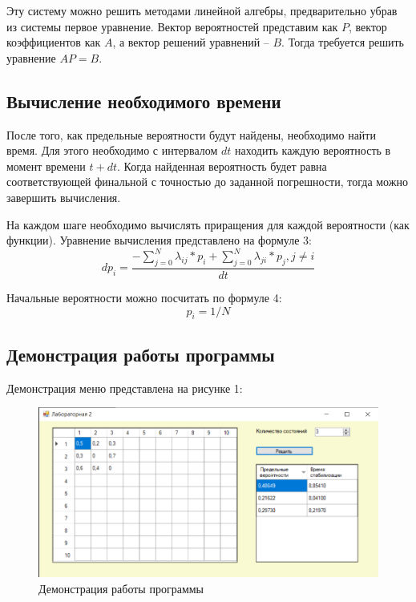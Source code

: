 Эту систему можно решить методами линейной алгебры, предварительно убрав из системы первое уравнение.
Вектор вероятностей представим как $P$, вектор коэффициентов как $A$, а вектор решений уравнений -- $B$. 
Тогда требуется решить уравнение $AP = B$.

\subsection*{Вычисление необходимого времени}
После того, как предельные вероятности будут найдены, необходимо найти время. 
Для этого необходимо с интервалом $dt$ находить каждую вероятность в момент времени $t + dt$. 
Когда найденная вероятность будет равна соответствующей финальной с точностью до заданной погрешности, тогда можно завершить вычисления. 

На каждом шаге необходимо вычислять приращения для каждой вероятности (как функции).
Уравнение вычисления представлено на формуле 3:
\begin{equation}
	dp_i = \frac{-\sum_{j = 0}^{N}{\lambda_{ij}} *p_i + \sum_{j = 0}^{N} \lambda_{ji}*p_j, j \neq i}{dt}
\end{equation}

Начальные вероятности можно посчитать по формуле 4:
\begin{equation}
	p_{i} = 1 / N
\end{equation}

\subsection*{Демонстрация работы программы}

Демонстрация меню представлена на рисунке 1:

\begin{figure}[h]
	\begin{center}
		\includegraphics[width=\linewidth]{inc/demonstrate.png}
	\end{center}
		\caption{Демонстрация работы программы}
\end{figure}

